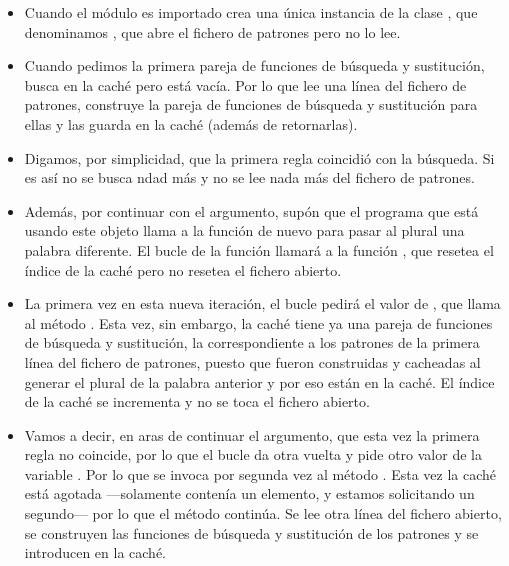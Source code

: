 \begin{itemize}

\item Cuando el módulo es importado crea una única instancia de la clase , que denominamos , que abre el fichero de patrones pero no lo lee.

\item Cuando pedimos la primera pareja de funciones de búsqueda y sustitución, busca en la caché pero está vacía. Por lo que lee una línea del fichero de patrones, construye la pareja de funciones de búsqueda y sustitución para ellas y las guarda en la caché (además de retornarlas).

\item Digamos, por simplicidad, que la primera regla coincidió con la búsqueda. Si es así no se busca ndad más y no se lee nada más del fichero de patrones.

\item Además, por continuar con el argumento, supón que el programa que está usando este objeto llama a la función  de nuevo para pasar al plural una palabra diferente. El bucle  de la función  llamará a la función , que resetea el índice de la caché pero no resetea el fichero abierto.

\item La primera vez en esta nueva iteración, el bucle  pedirá el valor de , que llama al método . Esta vez, sin embargo, la caché tiene ya una pareja de funciones de búsqueda y sustitución, la correspondiente a los patrones de la primera línea del fichero de patrones, puesto que fueron construidas y cacheadas al generar el plural de la palabra anterior y por eso están en la caché. El índice de la caché se incrementa y no se toca el fichero abierto.

\item Vamos a decir, en aras de continuar el argumento, que esta vez la primera regla no coincide, por lo que el bucle  da otra vuelta y pide otro valor de la variable . Por lo que se invoca por segunda vez al método . Esta vez la caché está agotada ---solamente contenía un elemento, y estamos solicitando un segundo--- por lo que el método  continúa. Se lee otra línea del fichero abierto, se construyen las funciones de búsqueda y sustitución de los patrones y se introducen en la caché.


\end{itemize}
